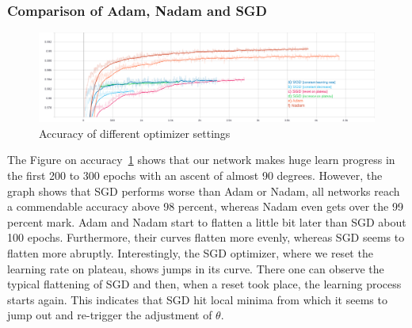 
\subsubsection*{Comparison of Adam, Nadam and SGD}
\begin{figure}[H]
    \centering
    \includegraphics[width=\textwidth,height=\textheight,keepaspectratio]{img/accuracy_all.png}
    \decoRule
    \caption[Experiments: Accuracy]{Accuracy of different optimizer settings}
    \label{fig:accuracy}
\end{figure}

The Figure on accuracy~\ref{fig:accuracy} shows that our network makes huge learn progress in the first
200 to 300 epochs with an ascent of almost 90 degrees.
However, the graph shows that SGD performs worse than Adam or Nadam, all networks reach a commendable accuracy above
98 percent, whereas Nadam even gets over the 99 percent mark.
Adam and Nadam start to flatten a little bit later than SGD about 100 epochs.
Furthermore, their curves flatten more evenly, whereas SGD
seems to flatten more abruptly.
Interestingly, the SGD optimizer, where we reset the learning rate on plateau, shows jumps in its curve.
There one can observe the typical flattening of SGD and then, when a reset took place, the learning process starts again.
This indicates that SGD hit local minima from which it seems to jump out and re-trigger the adjustment of $\theta$.






